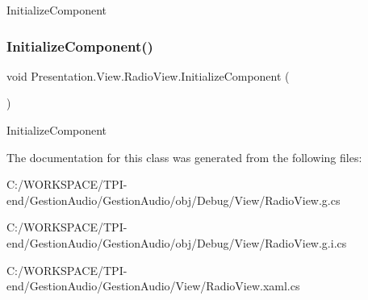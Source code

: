 Initialize\+Component 

\mbox{\label{class_presentation_1_1_view_1_1_radio_view_a1ecaa37c7376879dae58561a0a3266d8}} 
\subsubsection{\texorpdfstring{Initialize\+Component()}{InitializeComponent()}\hspace{0.1cm}{\footnotesize\ttfamily [4/4]}}
{\footnotesize\ttfamily void Presentation.\+View.\+Radio\+View.\+Initialize\+Component (\begin{DoxyParamCaption}{ }\end{DoxyParamCaption})}



Initialize\+Component 



The documentation for this class was generated from the following files\+:\begin{DoxyCompactItemize}
\item 
C\+:/\+W\+O\+R\+K\+S\+P\+A\+C\+E/\+T\+P\+I-\/end/\+Gestion\+Audio/\+Gestion\+Audio/obj/\+Debug/\+View/Radio\+View.\+g.\+cs\item 
C\+:/\+W\+O\+R\+K\+S\+P\+A\+C\+E/\+T\+P\+I-\/end/\+Gestion\+Audio/\+Gestion\+Audio/obj/\+Debug/\+View/Radio\+View.\+g.\+i.\+cs\item 
C\+:/\+W\+O\+R\+K\+S\+P\+A\+C\+E/\+T\+P\+I-\/end/\+Gestion\+Audio/\+Gestion\+Audio/\+View/Radio\+View.\+xaml.\+cs\end{DoxyCompactItemize}
